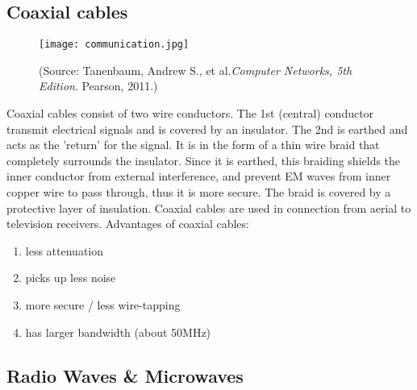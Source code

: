\documentclass{article}
\begin{document}
 
 \subsection{Coaxial cables}

 \begin{figure}[H]
     \centering
     \captionsetup{justification=centering,margin=2cm}
     \texttt{[image: communication.jpg]}
     \caption*{(Source: Tanenbaum, Andrew S., et al.\textit{Computer Networks, 5th Edition}. Pearson, 2011.)}
 \end{figure}
 Coaxial cables consist of two wire conductors. The 1st (central) conductor transmit electrical signals and is covered by an insulator. The 2nd is earthed and acts as the 'return' for the signal. It is in the form of a thin wire braid that completely surrounds the insulator. Since it is earthed, this braiding shields the inner conductor from external interference, and prevent EM waves from inner copper wire to pass through, thus it is more secure. The braid is covered by a protective layer of insulation. Coaxial cables are used in connection from aerial to television receivers.
\newpage
Advantages of coaxial cables:
 \begin{enumerate}
     \item less attenuation
     \item picks up less noise
     \item more secure / less wire-tapping
     \item has larger bandwidth (about 50MHz)
 \end{enumerate}
 

 \subsection{Radio Waves \& Microwaves}
\end{document}
